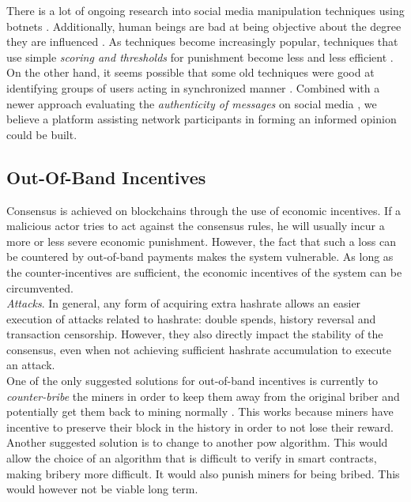 \documentclass[12pt,a4paper]{article}
\begin{document}
There is a lot of ongoing research into social media manipulation techniques using botnets \cite{botnet}. Additionally, human beings are bad at being objective about the degree they are influenced \cite{echo}. As techniques become increasingly popular, techniques that use simple \textit{scoring and thresholds} for punishment become less and less efficient \cite{countering}.\\

On the other hand, it seems possible that some old techniques were good at identifying groups of users acting in synchronized manner \cite{copycatch}. Combined with a newer approach evaluating the \textit{authenticity of messages} on social media \cite{authenticity}, we believe a platform assisting network participants in forming an informed opinion could be built.\\

\subsection{Out-Of-Band Incentives}

Consensus is achieved on \glspl{blockchain} through the use of economic incentives. If a malicious actor tries to act against the consensus rules, he will usually incur a more or less severe economic punishment. However, the fact that such a loss can be countered by out-of-band payments makes the system vulnerable. As long as the counter-incentives are sufficient, the economic incentives of the system can be circumvented.\\

\textit{Attacks}. In general, any form of acquiring extra hashrate allows an easier execution of attacks related to \gls{hashrate}: double spends, history reversal and transaction censorship. However, they also directly impact the stability of the \gls{consensus}, even when not achieving sufficient \gls{hashrate} accumulation to execute an attack.\\

One of the only suggested solutions for out-of-band incentives is currently to \textit{counter-bribe} the miners in order to keep them away from the original briber and potentially get them back to mining normally \cite{ethcc}. This works because miners have incentive to preserve their block in the history in order to not lose their \gls{reward}.\\

Another suggested solution is to change to another \acrshort{pow} algorithm. This would allow the choice of an algorithm that is difficult to verify in smart contracts, making bribery more difficult. It would also punish miners for being bribed. This would however not be viable long term.\\
\end{document}

